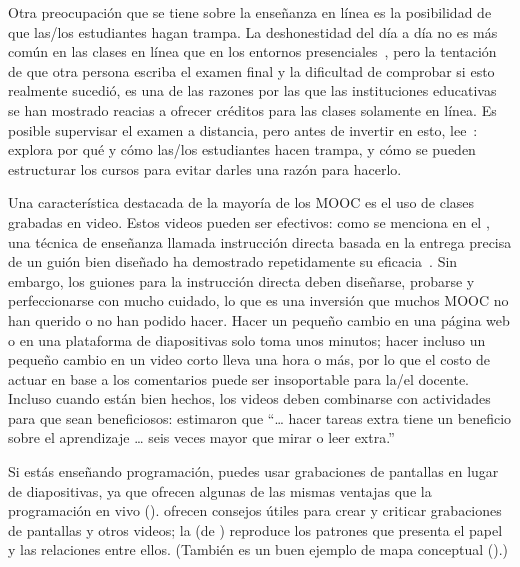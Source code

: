 Otra preocupación que se tiene sobre la enseñanza en línea es la posibilidad de que las/los estudiantes hagan trampa.
La deshonestidad del día a día no es más común en las clases en línea que en los entornos presenciales~\cite{Beck2014},
pero la tentación de que otra persona escriba el examen final
y la dificultad de comprobar si esto realmente sucedió,
es una de las razones por las que las instituciones educativas se han mostrado reacias a ofrecer créditos para las clases solamente en línea.
Es posible supervisar el examen a distancia,
pero antes de invertir en esto,
lee~\cite{Lang2013}:
explora por qué y cómo las/los estudiantes hacen trampa,
y cómo se pueden estructurar los cursos para evitar darles una razón para hacerlo.


Una característica destacada de la mayoría de los MOOC es el uso de clases grabadas en video.
Estos videos pueden ser efectivos:
como se menciona en el ,
una técnica de enseñanza llamada instrucción directa
basada en la entrega precisa de un guión bien diseñado ha demostrado repetidamente su eficacia~\cite{Stoc2018}.
Sin embargo,
los guiones para la instrucción directa deben diseñarse,
probarse
y perfeccionarse con mucho cuidado,
lo que es una inversión que muchos MOOC no han querido o no han podido hacer.
Hacer un pequeño cambio en una página web o en una plataforma de diapositivas solo toma unos minutos;
hacer incluso un pequeño cambio en un video corto lleva una hora o más,
por lo que el costo de actuar en base a los comentarios puede ser insoportable para la/el docente.
Incluso cuando están bien hechos,
los videos deben combinarse con actividades para que sean beneficiosos:
\cite{Koed2015} estimaron que
``{\ldots} hacer tareas extra tiene un beneficio sobre el aprendizaje {\ldots} seis veces mayor que mirar o leer extra.''

Si estás enseñando programación,
puedes usar grabaciones de pantallas en lugar de diapositivas,
ya que ofrecen algunas de las mismas ventajas que la programación en vivo ().
\cite{Chen2009} ofrecen consejos útiles para crear y criticar grabaciones de pantallas y otros videos; la
 (de \cite{Chen2009}) reproduce los patrones que presenta el papel
y las relaciones entre ellos.
(También es un buen ejemplo de mapa conceptual ().)


